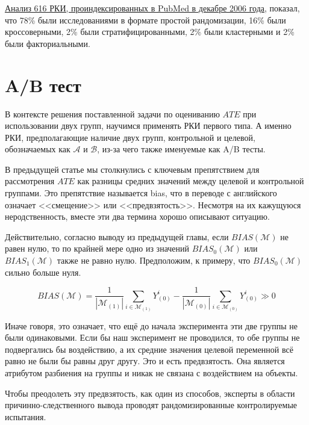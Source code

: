     \href{https://www.bmj.com/content/340/bmj.c723.full}{Анализ 616 РКИ, проиндексированных в PubMed в декабре 2006 года}, показал, что 78\% были исследованиями в формате простой рандомизации, 16\% были кроссоверными, 2\% были стратифицированными, 2\% были кластерными и 2\% были факториальными.


    \section*{A/B тест}

        В контексте решения поставленной задачи по оцениванию $ATE$ при использовании двух групп, научимся применять РКИ первого типа.
        А именно РКИ, предполагающие наличие двух групп, контрольной и целевой, обозначаемых как $\mathcal{A}$ и $\mathcal{B}$, из-за чего также именуемые как A/B тесты.

        В предыдущей статье мы столкнулись с ключевым препятствием для рассмотрения $ATE$ как разницы средних значений между целевой и контрольной группами.
        Это препятствие называется bias, что в переводе с английского означает <<смещение>> или <<предвзятость>>.
        Несмотря на их кажущуюся неродственность, вместе эти два термина хорошо описывают ситуацию.

        Действительно, согласно выводу из предыдущей главы, если $BIAS(\mathcal{M})$ не равен нулю, то по крайней мере одно из значений $BIAS_0(\mathcal{M})$ или $BIAS_1(\mathcal{M})$ также не равно нулю.
        Предположим, к примеру, что $BIAS_0(\mathcal{M})$ сильно больше нуля.

        \[
            BIAS(\mathcal{M}) =
            \frac{1}{|\mathcal{M}_{(1)}|} \displaystyle\sum_{i\in\mathcal{M}_{(1)}}
            Y^i_{(0)} -
            \frac{1}{|\mathcal{M}_{(0)}|} \displaystyle\sum_{i\in\mathcal{M}_{(0)}}
            Y^i_{(0)} \gg 0
        \]

        Иначе говоря, это означает, что ещё до начала эксперимента эти две группы не были одинаковыми.
        Если бы наш эксперимент не проводился, то обе группы не подвергались бы воздействию, а их средние значения целевой переменной всё равно не были бы равны друг другу.
        Это и есть предвзятость.
        Она является атрибутом разбиения на группы и никак не связана с воздействием на объекты.

        Чтобы преодолеть эту предвзятость, как один из способов, эксперты в области причинно-следственного вывода проводят рандомизированные контролируемые испытания.


